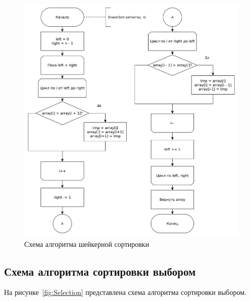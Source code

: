 \documentclass[12pt]{report}
\begin{document}
    \begin{figure}[H]
        \centering
        \includegraphics[width=1.01\linewidth]{img/ShakerSort}
        \caption{Схема алгоритма шейкерной сортировки}
        \label{fig:Shaker}
    \end{figure}

    \subsection{Схема алгоритма сортировки выбором}
    На рисунке~\ref{fig:Selection} представлена схема алгоритма сортировки выбором.

    \captionsetup{justification=centering, singlelinecheck=false}
\end{document}
